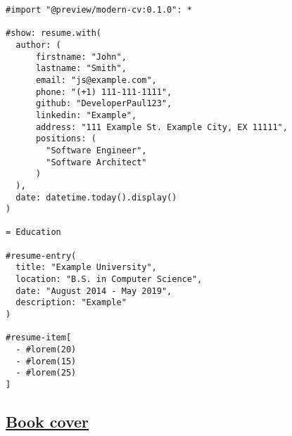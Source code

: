 \begin{verbatim}
#import "@preview/modern-cv:0.1.0": *

#show: resume.with(
  author: (
      firstname: "John", 
      lastname: "Smith",
      email: "js@example.com", 
      phone: "(+1) 111-111-1111",
      github: "DeveloperPaul123",
      linkedin: "Example",
      address: "111 Example St. Example City, EX 11111",
      positions: (
        "Software Engineer",
        "Software Architect"
      )
  ),
  date: datetime.today().display()
)

= Education

#resume-entry(
  title: "Example University",
  location: "B.S. in Computer Science",
  date: "August 2014 - May 2019",
  description: "Example"
)

#resume-item[
  - #lorem(20)
  - #lorem(15)
  - #lorem(25)
]
\end{verbatim}

\pandocbounded{}

\subsection{\texorpdfstring{\hyperref[book-cover]{Book
cover}}{Book cover}}\label{book-cover}

